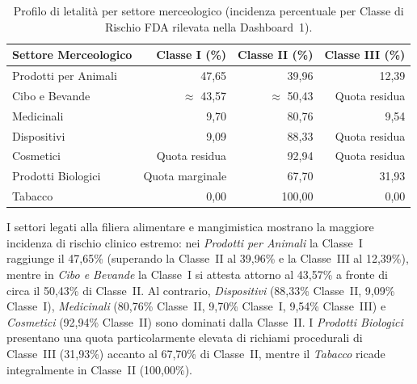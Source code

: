 \begin{table}[htbp]
\centering
\caption{Profilo di letalità per settore merceologico (incidenza percentuale per Classe di Rischio FDA rilevata nella Dashboard~1).}
\label{tab:sector_lethality}
\begin{tabularx}{\textwidth}{@{}Xrrr@{}}
\toprule
\textbf{Settore Merceologico} & \textbf{Classe I (\%)} & \textbf{Classe II (\%)} & \textbf{Classe III (\%)} \\
\midrule
Prodotti per Animali & 47,65 & 39,96 & 12,39 \\
Cibo e Bevande & $\approx$ 43,57 & $\approx$ 50,43 & Quota residua \\
Medicinali & 9,70 & 80,76 & 9,54 \\
Dispositivi & 9,09 & 88,33 & Quota residua \\
Cosmetici & Quota residua & 92,94 & Quota residua \\
Prodotti Biologici & Quota marginale & 67,70 & 31,93 \\
Tabacco & 0,00 & 100,00 & 0,00 \\
\bottomrule
\end{tabularx}
\end{table}

I settori legati alla filiera alimentare e mangimistica mostrano la maggiore incidenza di rischio clinico estremo: nei \textit{Prodotti per Animali} la Classe~I raggiunge il 47,65\% (superando la Classe~II al 39,96\% e la Classe~III al 12,39\%), mentre in \textit{Cibo e Bevande} la Classe~I si attesta attorno al 43,57\% a fronte di circa il 50,43\% di Classe~II. Al contrario, \textit{Dispositivi} (88,33\% Classe~II, 9,09\% Classe~I), \textit{Medicinali} (80,76\% Classe~II, 9,70\% Classe~I, 9,54\% Classe~III) e \textit{Cosmetici} (92,94\% Classe~II) sono dominati dalla Classe~II. I \textit{Prodotti Biologici} presentano una quota particolarmente elevata di richiami procedurali di Classe~III (31,93\%) accanto al 67,70\% di Classe~II, mentre il \textit{Tabacco} ricade integralmente in Classe~II (100,00\%).

